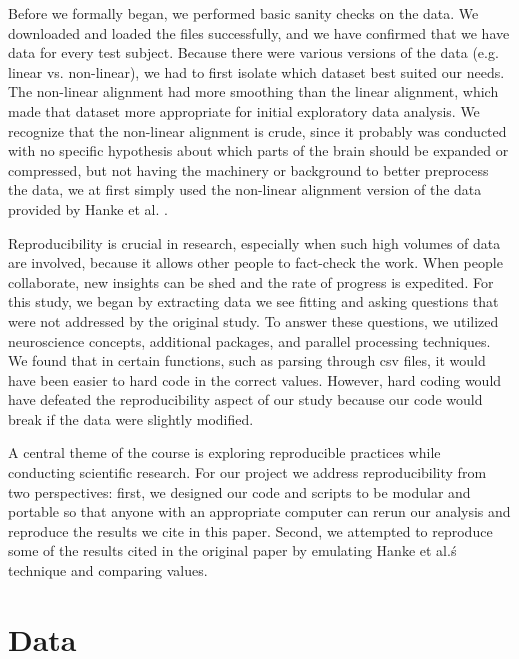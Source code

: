 \documentclass[11pt]{article}
\begin{document}
Before we formally began, we performed basic sanity checks on the data. We
downloaded and loaded the files successfully, and we have confirmed that we
have data for every test subject. Because there were various versions of the
data (e.g. linear vs. non-linear), we had to first isolate which dataset best
suited our needs. The non-linear alignment had more smoothing than the linear
alignment, which made that dataset more appropriate for initial exploratory
data analysis.  We recognize that the non-linear alignment is crude, since it
probably was conducted with no specific hypothesis about which parts of the
brain should be expanded or compressed, but not having the machinery or
background to better preprocess the data, we at first simply used the non-linear
alignment version of the data provided by Hanke et al.
\cite{hank2014audiomovie}.

Reproducibility is crucial in research, especially when such high volumes of
data are involved, because it allows other people to fact-check the work. When
people collaborate, new insights can be shed and the rate of progress is
expedited. For this study, we began by extracting data we see fitting and
asking questions that were not addressed by the original study. To answer
these questions, we utilized neuroscience concepts, additional packages, and
parallel processing techniques. We found that in certain functions, such as
parsing through csv files, it would have been easier to hard code in the
correct values. However, hard coding would have defeated the reproducibility
aspect of our study because our code would break if the data were slightly
modified.

A central theme of the course is exploring reproducible practices while conducting scientific research. For our project we address reproducibility 
from two perspectives: first, we designed our code and scripts to be modular 
and portable so that anyone with an appropriate computer can rerun our analysis 
and reproduce the results we cite in this paper. Second, we attempted to reproduce 
some of the results cited in the original paper by emulating Hanke et al.\'s 
technique and comparing values. 

\section{Data}
\end{document}
